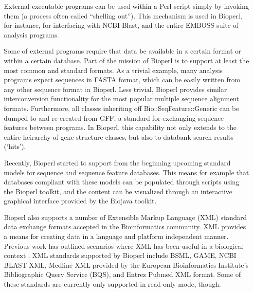 \documentclass[12pt]{article}
\begin{document}
External executable programs can be used within a Perl script simply
by invoking them (a process often called ``shelling out''). This
mechanism is used in Bioperl, for instance, for interfacing with NCBI
Blast, and the entire EMBOSS suite of analysis programs. 

Some of external programs require that data be available in a certain
format or within a certain database.  Part of the mission of Bioperl
is to support at least the most common and standard formats. As a
trivial example, many analysis programs expect sequences in FASTA
format, which can be easily written from any other sequence format in
Bioperl. Less trivial, Bioperl provides similar interconversion
functionality for the most popular multiple sequence alignment
formats. Furthermore, all classes inheriting off
Bio::SeqFeature::Generic can be dumped to and re-created from GFF, a
standard for exchanging sequence features between programs. In
Bioperl, this capability not only extends to the entire heirarchy of
gene structure classes, but also to databank search results (`hits').

Recently, Bioperl started to support from the beginning upcoming
standard models for sequence and sequence feature databases. This
means for example that databases compliant with these models can be
populated through scripts using the Bioperl toolkit, and the content
can be visualized through an interactive graphical interface provided by
the Biojava toolkit.

Bioperl also supports a number of Extensible Markup Language (XML)
standard data exchange formats accepted in the Bioinformatics
community. XML provides a means for creating data in a language and
platform independent manner.  Previous work has outlined scenarios
where XML has been useful in a biological context
\cite{xmlbioinformatics}.  XML standards supported by Bioperl include
BSML, GAME, NCBI BLAST XML, Medline XML provided by the European
Bioinformatics Institute's Bibliographic Query Service (BQS), and
Entrez Pubmed XML format. Some of these standards are currently only
supported in read-only mode, though.
\end{document}
